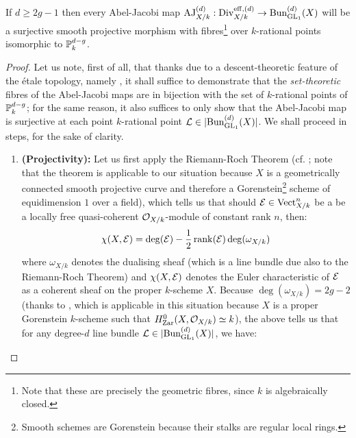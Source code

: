         \begin{proposition} \label{prop: the_abel_jacobi_map_is_a_smooth_projective_fibration}
            If $d \geq 2g - 1$ then every Abel-Jacobi map $\AJ_{X/k}^{(d)}: \Div_{X/k}^{\eff, (d)} \to \Bun_{\GL_1}^{(d)}(X)$ will be a surjective smooth projective morphism with fibres\footnote{Note that these are precisely the geometric fibres, since $k$ is algebraically closed.} over $k$-rational points isomorphic to $\P^{d - g}_k$.
        \end{proposition}
            \begin{proof}
                Let us note, first of all, that thanks due to a descent-theoretic feature of the \'etale topology, namely \cite[\href{https://stacks.math.columbia.edu/tag/024V}{Tag 024V}]{stacks}, it shall suffice to demonstrate that the \textit{set-theoretic} fibres of the Abel-Jacobi maps are in bijection with the set of $k$-rational points of $\P_k^{d - g}$; for the same reason, it also suffices to only show that the Abel-Jacobi map is surjective at each point $k$-rational point $\calL \in |\Bun_{\GL_1}^{(d)}(X)|$. We shall proceed in steps, for the sake of clarity.
                    \begin{enumerate}
                        \item \textbf{(Projectivity):} Let us first apply the Riemann-Roch Theorem (cf. \cite[\href{https://stacks.math.columbia.edu/tag/0BS6}{Tag 0BS6}]{stacks}; note that the theorem is applicable to our situation because $X$ is a geometrically connected smooth projective curve and therefore a Gorenstein\footnote{Smooth schemes are Gorenstein because their stalks are regular local rings.} scheme of equidimension $1$ over a field), which tells us that should $\E \in \Vect_{X/k}^n$ be a be a locally free quasi-coherent $\calO_{X/k}$-module of constant rank $n$, then:
                            $$\chi(X, \E) = \deg(\E) - \frac12\rank(\E) \deg(\omega_{X/k})$$
                        where $\omega_{X/k}$ denotes the dualising sheaf (which is a line bundle due also to the Riemann-Roch Theorem) and $\chi(X, \E)$ denotes the Euler characteristic of $\E$ as a coherent sheaf on the proper $k$-scheme $X$. Because $\deg(\omega_{X/k}) = 2g - 2$ (thanks to \cite[\href{https://stacks.math.columbia.edu/tag/0C19}{Tag 0C19}]{stacks}, which is applicable in this situation because $X$ is a proper Gorenstein $k$-scheme such that $H^0_{\Zar}(X, \calO_{X/k}) \cong k$), the above tells us that for any degree-$d$ line bundle $\calL \in |\Bun_{\GL_1}^{(d)}(X)|$, we have:

\end{enumerate}
\end{proof}

